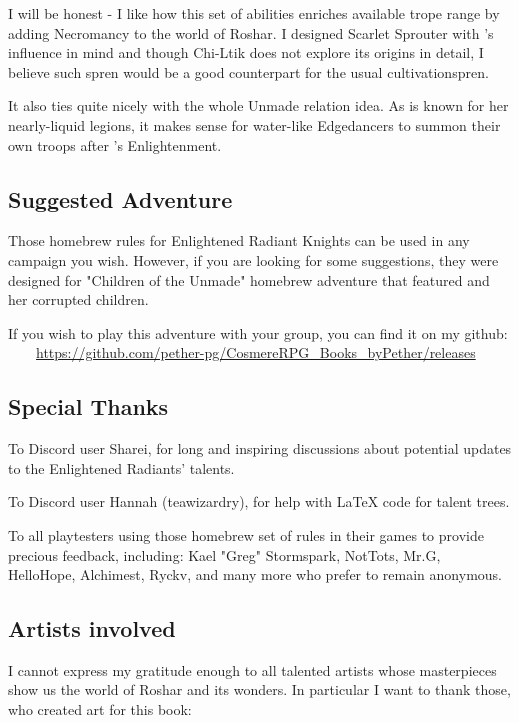 I will be honest - I like how this set of abilities enriches available trope range by adding Necromancy to the world of Roshar. I designed Scarlet Sprouter with \npcSjaAnat{}'s influence in mind and though Chi-Ltik does not explore its origins in detail, I believe such spren would be a good counterpart for the usual cultivationspren.

It also ties quite nicely with the whole Unmade relation idea. As \npcMidnightMotherTitle{} is known for her nearly-liquid legions, it makes sense for water-like Edgedancers to summon their own troops after \npcSjaAnat{}'s Enlightenment.


\subsection{Suggested Adventure}

Those homebrew rules for Enlightened Radiant Knights can be used in any campaign you wish. However, if you are looking for some suggestions, they were designed for "Children of the Unmade" homebrew adventure that featured \npcSjaAnat{} and her corrupted children.

If you wish to play this adventure with your group, you can find it on my github: \\

~~~~\url{https://github.com/pether-pg/CosmereRPG_Books_byPether/releases}



\newpage
\subsection{Special Thanks}

To Discord user Sharei, for long and inspiring discussions about potential updates to the Enlightened Radiants' talents. 

To Discord user Hannah (teawizardry), for help with \LaTeX{} code for talent trees. 

To all playtesters using those homebrew set of rules in their games to provide precious feedback, including:  Kael "Greg" Stormspark, NotTots, Mr.G, HelloHope, Alchimest, Ryckv, and many more who prefer to remain anonymous.

\subsection{Artists involved}

I cannot express my gratitude enough to all talented artists whose masterpieces show us the world of Roshar and its wonders. In particular I want to thank those, who created art for this book:

